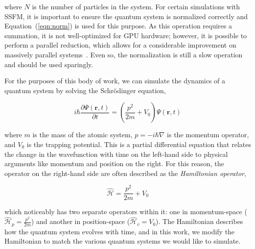 \noindent where $N$ is the number of particles in the system.
For certain simulations with SSFM, it is important to ensure the quantum system is normalized correctly and Equation~(\ref{eqn:norm}) is used for this purpose.
As this operation requires a summation, it is not well-optimized for GPU hardware; however, it is possible to perform a parallel reduction, which allows for a considerable improvement on massively parallel systems~\cite{harris2007}.
Even so, the normalization is still a slow operation and should be used sparingly.

For the purposes of this body of work, we can simulate the dynamics of a quantum system by solving the Schr\"odinger equation,

\begin{equation}
    i\hbar\frac{\partial\Psi(\mathbf{r},t)}{\partial t} = \left(\frac{p^2}{2m} + V_0\right) \Psi(\mathbf{r},t)
    \label{eqn:schrody}
\end{equation}

\noindent where $m$ is the mass of the atomic system, $p = -i\hbar\nabla$ is the momentum operator, and $V_0$ is the trapping potential.
This is a partial differential equation that relates the change in the wavefunction with time on the left-hand side to physical arguments like momentum and position on the right.
For this reason, the operator on the right-hand side are often described as the \textit{Hamiltonian operator}, 

\begin{equation}
\mathcal{\hat H} = \frac{p^2}{2m} + V_0
\end{equation}

\noindent which noticeably has two separate operators within it: one in momentum-space ($\mathcal{\hat H}_p = \frac{p^2}{2m}$) and another in position-space ($\mathcal{\hat H}_v = V_0$).
The Hamiltonian describes how the quantum system evolves with time, and in this work, we modify the Hamiltonian to match the various quantum systems we would like to simulate.


